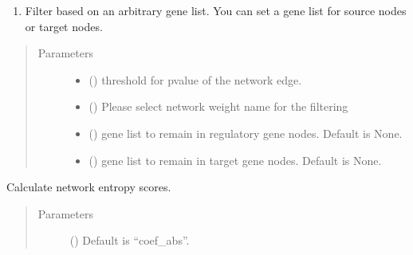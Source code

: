 \documentclass[letterpaper,10pt,english]{sphinxmanual}
\begin{document}
\begin{fulllineitems}
\begin{fulllineitems}
\begin{enumerate}
\item {} 
Filter based on an arbitrary gene list. You can set a gene list for source nodes or target nodes.

\end{enumerate}
\begin{quote}\begin{description}
\item[{Parameters}] \leavevmode\begin{itemize}
\item {} 
 () \textendash{} threshold for p\sphinxhyphen{}value of the network edge.

\item {} 
 () \textendash{} Please select network weight name for the filtering

\item {} 
 () \textendash{} gene list to remain in regulatory gene nodes. Default is None.

\item {} 
 () \textendash{} gene list to remain in target gene nodes. Default is None.

\end{itemize}

\end{description}\end{quote}

\end{fulllineitems}


\begin{fulllineitems}
\label{\detokenize{modules/celloracle:celloracle.Links.get_network_entropy}}
Calculate network entropy scores.
\begin{quote}\begin{description}
\item[{Parameters}] \leavevmode
{} () \textendash{} Default is “coef\_abs”.


\end{description}
\end{quote}
\end{fulllineitems}
\end{fulllineitems}
\end{document}

